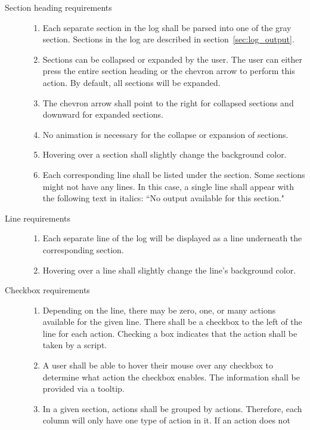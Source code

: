 \begin{description}
\item[Section heading requirements] \hfill
\begin{enumerate}
  \item Each separate section in the log shall be parsed into one of the gray
  section.  Sections in the log are described in section~\ref{sec:log_output}.
  \item Sections can be collapsed or expanded by the user.  The user can either
  press the entire section heading or the chevron arrow to perform this action.
  By default, all sections will be expanded.
  \item The chevron arrow shall point to the right for collapsed sections and
  downward for expanded sections.
  \item No animation is necessary for the collapse or expansion of sections.
  \item Hovering over a section shall slightly change the background color.
  \item Each corresponding line shall be listed under the section.  Some
  sections might not have any lines.  In this case, a single line shall appear
  with the following text in italics: ``No output available for this section."
\end{enumerate}
\item[Line requirements] \hfill
\begin{enumerate}
  \item Each separate line of the log will be displayed as a line underneath the
  corresponding section.
  \item Hovering over a line shall slightly change the line's background color.
\end{enumerate}
\item[Checkbox requirements] \hfill
\begin{enumerate}
  \item Depending on the line, there may be zero, one, or many actions available
  for the given line.  There shall be a checkbox to the left of the line for
  each action.  Checking a box indicates that the action shall be taken by a
  script.
  \item A user shall be able to hover their mouse over any checkbox to
  determine what action the checkbox enables.  The information shall be provided
  via a tooltip. 
  \item In a given section, actions shall be grouped by actions.  Therefore,
  each column will only have one type of action in it.  If an action does not

\end{enumerate}
\end{description}
